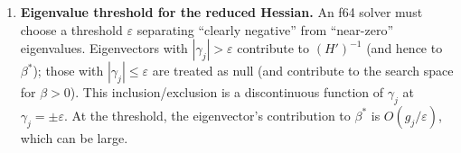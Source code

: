 \begin{remark}
\begin{enumerate}
  \item \textbf{Eigenvalue threshold for the reduced Hessian.}
    An f64 solver must choose a threshold $\varepsilon$ separating
    ``clearly negative'' from ``near-zero'' eigenvalues.
    Eigenvectors with $|\gamma_j| > \varepsilon$ contribute to
    $(H')^{-1}$ (and hence to $\beta^*$); those with
    $|\gamma_j| \leq \varepsilon$ are treated as null
    (and contribute to the search space for $\beta > 0$).
    This inclusion/exclusion is a discontinuous function of
    $\gamma_j$ at $\gamma_j = \pm\varepsilon$.
    At the threshold, the eigenvector's contribution to
    $\beta^*$ is $O(g_j / \varepsilon)$, which can be large.

\end{enumerate}
\end{remark}


%



